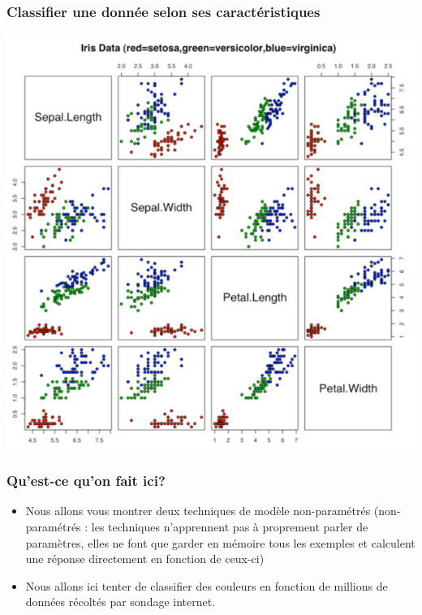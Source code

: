 \documentclass[french]{beamer}
\begin{document}
\begin{frame}[fragile]
\frametitle{Classifier une donnée selon ses
caractéristiques}

\begin{center}
\includegraphics[scale=0.3]{11.png}
\end{center}

\end{frame}



\begin{frame}
\frametitle{Qu'est-ce qu'on fait ici?}

\begin{itemize}
\item Nous allons vous montrer deux techniques de modèle non-paramétrés (non-paramétrés : les techniques n'apprennent pas à proprement parler de paramètres, elles ne font que garder en mémoire tous les exemples et calculent une réponse directement en fonction de ceux-ci)
\item Nous allons ici tenter de classifier des couleurs en fonction de millions de données récoltés par sondage internet. 
\end{itemize}

\end{frame}
\end{document}
